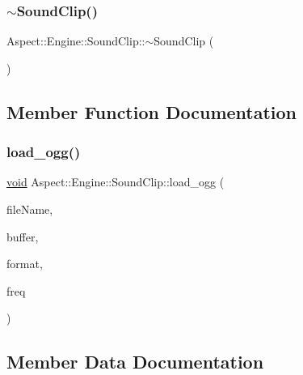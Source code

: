 \subsubsection{\texorpdfstring{$\sim$\+Sound\+Clip()}{~SoundClip()}}
{\footnotesize\ttfamily Aspect\+::\+Engine\+::\+Sound\+Clip\+::$\sim$\+Sound\+Clip (\begin{DoxyParamCaption}{ }\end{DoxyParamCaption})\hspace{0.3cm}{\ttfamily [inline]}}



\subsection{Member Function Documentation}
\mbox{\label{struct_aspect_1_1_engine_1_1_sound_clip_afe23f1aea045236c4ced62ff144e3fbe}} 
\subsubsection{\texorpdfstring{load\+\_\+ogg()}{load\_ogg()}}
{\footnotesize\ttfamily \mbox{\hyperlink{_s_d_l__opengles2__gl2ext_8h_ae5d8fa23ad07c48bb609509eae494c95}{void}} Aspect\+::\+Engine\+::\+Sound\+Clip\+::load\+\_\+ogg (\begin{DoxyParamCaption}\item[{\mbox{\hyperlink{_s_d_l__opengl__glext_8h_ae84541b4f3d8e1ea24ec0f466a8c568b}{std\+::string}}}]{file\+Name,  }\item[{std\+::vector$<$ char $>$ \&}]{buffer,  }\item[{\mbox{\hyperlink{al_8h_a715098c13211f3570a9288a27f87fdfa}{A\+Lenum}} \&}]{format,  }\item[{\mbox{\hyperlink{al_8h_ab966c4d5d554fee3ae4e5c7774e83c7e}{A\+Lsizei}} \&}]{freq }\end{DoxyParamCaption})\hspace{0.3cm}{\ttfamily [inline]}}



\subsection{Member Data Documentation}
\mbox{\label{struct_aspect_1_1_engine_1_1_sound_clip_a4f13ca26dcad6392765f5c170cf1031d}} 
